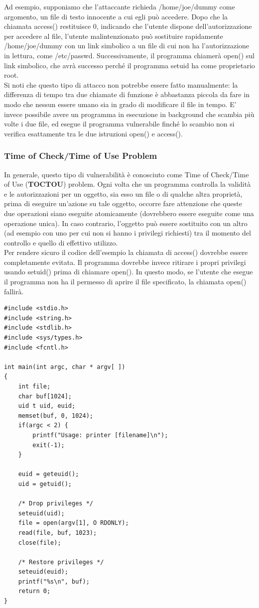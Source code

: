 Ad esempio, supponiamo che l'attaccante richieda /home/joe/dummy come argomento, un file di testo innocente a cui egli può accedere. Dopo che la chiamata access() restituisce 0, indicando che l'utente dispone dell'autorizzazione per accedere al file, l'utente malintenzionato può sostituire rapidamente /home/joe/dummy con un link simbolico a un file di cui non ha l'autorizzazione in lettura, come /etc/passwd. Successivamente, il programma chiamerà open() sul link simbolico, che avrà successo perché il programma setuid ha come proprietario
root. \\

Si noti che questo tipo di attacco non potrebbe essere fatto manualmente: la differenza di tempo tra due chiamate di funzione è abbastanza piccola da fare in modo che nessun essere umano sia in grado di modificare il file in tempo. E’ invece possibile avere un programma in esecuzione in background che scambia più volte i due file, ed esegue il programma vulnerabile finché lo scambio non si verifica esattamente tra le due istruzioni open() e access().

\subsubsection{Time of Check/Time of Use Problem}
In generale, questo tipo di vulnerabilità è conosciuto come Time of Check/Time of Use (\textbf{TOCTOU}) problem. Ogni volta che un programma controlla la validità e le autorizzazioni per un oggetto, sia esso un file o di qualche altra proprietà, prima di eseguire un'azione su tale oggetto, occorre fare attenzione che queste due operazioni siano eseguite atomicamente (dovrebbero essere eseguite come una operazione unica). In caso contrario, l'oggetto può essere sostituito con un altro (ad esempio con uno per cui non si hanno i privilegi richiesti) tra il momento del controllo e quello di effettivo utilizzo. \\

Per rendere sicuro il codice dell'esempio la chiamata di access() dovrebbe essere completamente evitata. Il programma dovrebbe invece ritirare i propri privilegi usando setuid() prima di chiamare open(). In questo modo, se l'utente che esegue il programma non ha il permesso di aprire il file specificato, la chiamata open() fallirà.
\begin{algorithm}
\begin{lstlisting}[caption={Esempio codice sicuro}]
#include <stdio.h>
#include <string.h>
#include <stdlib.h>
#include <sys/types.h>
#include <fcntl.h>

int main(int argc, char * argv[ ])
{
	int file;
	char buf[1024];
	uid t uid, euid;
	memset(buf, 0, 1024);
	if(argc < 2) {
		printf("Usage: printer [filename]\n");
		exit(-1);
	}
	
	euid = geteuid();
	uid = getuid();
	
	/* Drop privileges */
	seteuid(uid);
	file = open(argv[1], O RDONLY);
	read(file, buf, 1023);
	close(file);

	/* Restore privileges */
	seteuid(euid);
	printf("%s\n", buf);
	return 0;
}
\end{lstlisting}
\end{algorithm}